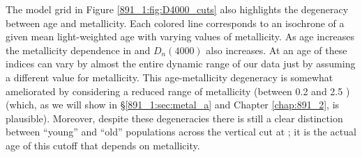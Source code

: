 

The model grid in Figure \ref{891_1:fig:D4000_cuts} also highlights
the degeneracy between age and metallicity. Each colored line
corresponds to an isochrone of a given mean light-weighted age with
varying values of metallicity. As age increases the metallicity
dependence in \Hda and $D_n(4000)$ also increases. At an age of
 these indices can vary by almost the entire
dynamic range of our data just by assuming a different value for
metallicity.  This age-metallicity degeneracy is somewhat ameliorated
by considering a reduced range of metallicity (between 0.2 and 2.5
\Zsol) (which, as we will show in \S\ref{891_1:sec:metal_a} and
Chapter \ref{chap:891_2}, is plausible). Moreover, despite these
degeneracies there is still a clear distinction between ``young'' and
``old'' populations across the vertical cut at ; it is
the actual age of this cutoff that depends on metallicity.

